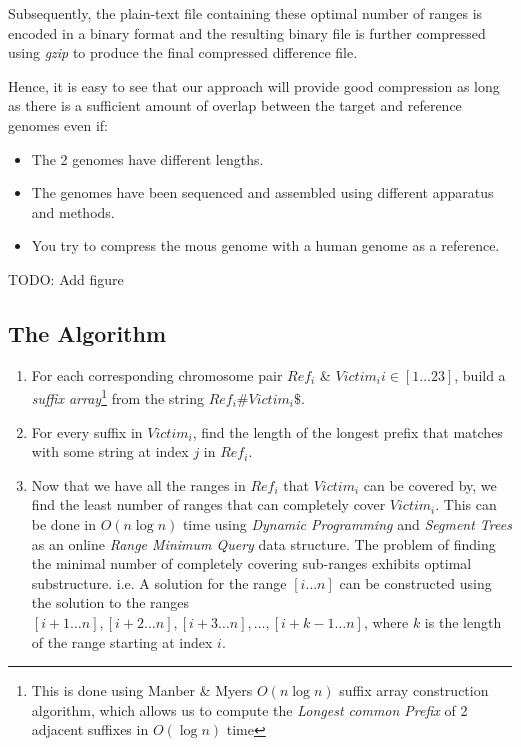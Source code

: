 \documentclass[11pt]{article}
\begin{document}
Subsequently, the plain-text file containing these optimal number of
ranges is encoded in a binary format and the resulting binary file is
further compressed using \textit{gzip} to produce the final compressed
difference file.

Hence, it is easy to see that our approach will provide good
compression as long as there is a sufficient amount of overlap between
the target and reference genomes even if:
\begin{itemize}
\item The 2 genomes have different lengths.
\item The genomes have been sequenced and assembled using different
  apparatus and methods.
\item You try to compress the mous genome with a human genome as a
  reference.
\end{itemize}

TODO: Add figure

\subsection{The Algorithm}

\begin{enumerate}

\item For each corresponding chromosome pair ${Ref}_i$ \& $Victim_i i
  \in [1\ldots{}23]$, build a
  \textit{suffix array}\footnote{This is done using Manber \& Myers
    $O(n\log{n})$ suffix array construction
    algorithm\cite{manbermyers}, which allows us to compute the
    \textit{Longest common Prefix} of 2 adjacent suffixes in
    $O(\log{n})$ time} from the string $Ref_i\#Victim_i\$$.

\item For every suffix in ${Victim}_i$, find the length of the longest
  prefix that matches with some string at index $j$ in ${Ref}_i$.

\item Now that we have all the ranges in $Ref_i$ that $Victim_i$ can
  be covered by, we find the least number of ranges that can
  completely cover $Victim_i$. This can be done in $O(n\log{n})$ time
  using \textit{Dynamic Programming} and \textit{Segment Trees} as an
  online \textit{Range Minimum Query} data structure. The problem of
  finding the minimal number of completely covering sub-ranges
  exhibits optimal substructure. i.e. A solution for the range
  $[i\ldots{}n]$ can be constructed using the solution to the ranges
  $[i+1\ldots{}n], [i+2\ldots{}n], [i+3\ldots{}n], \ldots{},
  [i+k-1\ldots{}n]$, where $k$ is the length of the range starting at
  index $i$.

\end{enumerate}
\end{document}

